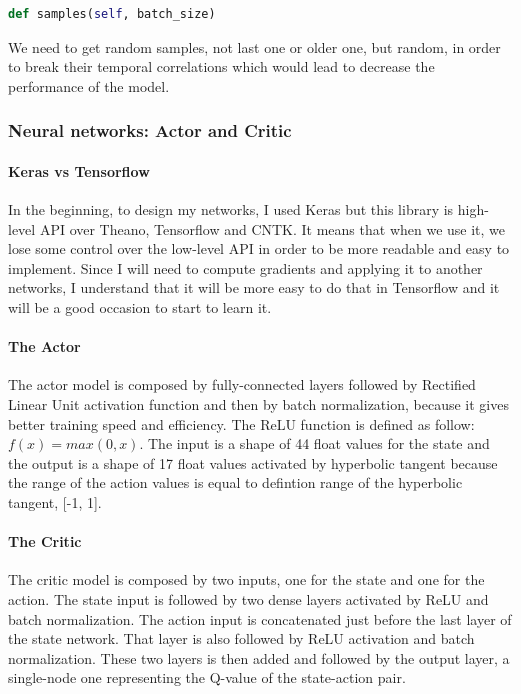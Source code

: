 \documentclass{article}
\begin{document}
\begin{lstlisting}[language=Python]
def samples(self, batch_size)
\end{lstlisting}

We need to get random samples, not last one or older one, but random, in order to
break their temporal correlations which would lead to decrease the performance
of the model.

\subsubsection{Neural networks: Actor and Critic}

\paragraph{Keras vs Tensorflow}

In the beginning, to design my networks, I used Keras but this library is
high-level API over Theano, Tensorflow and CNTK. It means that when we use it,
we lose some control over the low-level API in order to be more readable and
easy to implement. Since I will need to compute gradients and applying it to
another networks, I understand that it will be more easy to do that in
Tensorflow and it will be a good occasion to start to learn it.

\paragraph{The Actor}

The actor model is composed by fully-connected layers followed by Rectified
Linear Unit activation function and then by batch normalization, because it
gives better training speed and efficiency. The ReLU function is defined as
follow: $f(x) = max(0, x)$. 
The input is a shape of 44 float values for the state and the output is a shape
of 17 float values activated by hyperbolic tangent because the range of the
action values is equal to defintion range of the hyperbolic tangent, [-1, 1].

\paragraph{The Critic}

The critic model is composed by two inputs, one for the state and one for the
action. The state input is followed by two dense layers activated by ReLU
and batch normalization. The action input is concatenated just before the last layer
of the state network. That layer is also followed by ReLU activation and
batch normalization. These two layers is then added and followed by the output
layer, a single-node one representing the Q-value of the state-action pair.
\end{document}
